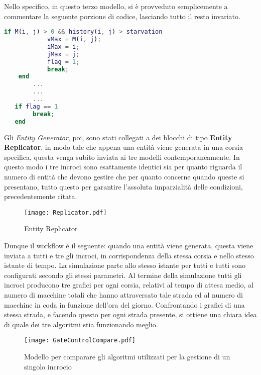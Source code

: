 Nello specifico, in questo terzo modello, si è provveduto semplicemente a commentare la seguente porzione di codice, lasciando tutto il resto invariato.
\newline
\begin{lstlisting}[language=Matlab,label=starvation,caption= Porzione di codice relativa alla gestione della starvation]
    if M(i, j) > 0 && history(i, j) > starvation
            vMax = M(i, j);
            iMax = i;
            jMax = j;
            flag = 1;
            break;
    end
        ...
        ...
        ...
   if flag == 1
        break;
   end
\end{lstlisting}

Gli \textit{Entity Generator}, poi, sono stati collegati a dei blocchi di tipo \textbf{Entity Replicator\cite{entityreplicator}}, in modo tale che appena una entità viene generata in una corsia specifica, questa venga subito inviata ai tre modelli contemporaneamente. In questo modo i tre incroci sono esattamente identici sia per quanto riguarda il numero di entità che devono gestire che per quanto concerne quando queste si presentano, tutto questo per garantire l'assoluta imparzialità delle condizioni, precedentemente citata.
\newline

\begin{figure}[H]
\centering
  \texttt{[image: Replicator.pdf]}
  \caption{Entity Replicator}
  \label{fig:}
\end{figure}

Dunque il workflow è il seguente: quando una entità viene generata, questa viene inviata a tutti e tre gli incroci, in corrispondenza della stessa corsia e nello stesso istante di tempo. La simulazione parte allo stesso istante per tutti e tutti sono configurati secondo gli stessi parametri. Al termine della simulazione tutti gli incroci producono tre grafici per ogni corsia, relativi al tempo di attesa medio, al numero di macchine totali che hanno attraversato tale strada ed al numero di macchine in coda in funzione dell'ora del giorno. Confrontando i grafici di una stessa strada, e facendo questo per ogni strada presente, si ottiene una chiara idea di quale dei tre algoritmi stia funzionando meglio.

\newpage

\begin{figure}[H]
  \texttt{[image: GateControlCompare.pdf]}
  \caption{Modello per comparare gli algoritmi utilizzati per la gestione di un singolo incrocio}
  \label{fig:gatecontrolcompare}
\end{figure}

